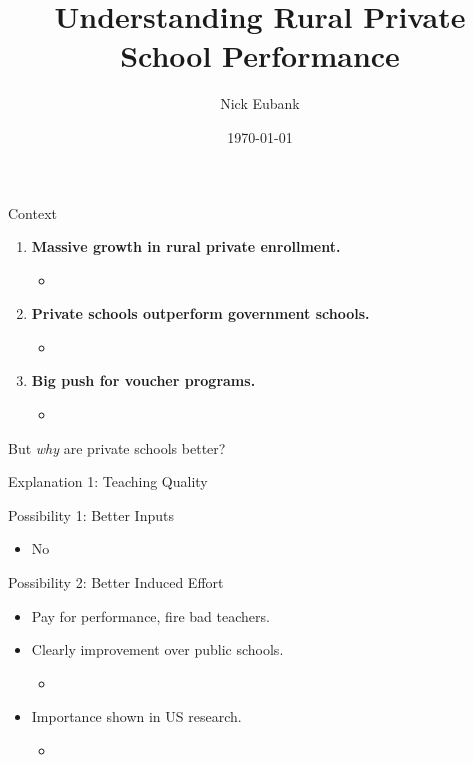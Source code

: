 \documentclass{beamer}
\title{Understanding Rural Private School Performance}
\author{Nick Eubank}
\date{\today}
\begin{document}
 

\begin{frame}{}
	\titlepage
\end{frame}

\begin{frame}{Context}
	\begin{enumerate}
		\item \textbf{Massive growth in rural private enrollment. }
			\begin{itemize}
				\item \cite{Andrabi:2008ji, Pratham:2005vw}
			\end{itemize}
		\pause
		\item \textbf{Private schools outperform government schools.}
			\begin{itemize}
				\item \cite{Jimenez:1991wa, Jimenez:1995vg, Pratham:2005vw, Andrabi:2011hl, Desai:2009ty, Tooley:2003vf, Alderman:2003we, Alderman:2001wk}
		\end{itemize}	
		\pause
		\item \textbf{Big push for voucher programs.}
		\begin{itemize}
			\item \cite{Chakrabarti:2008vc, Kelkar:2006tq, Panagariya:2008wi}
		\end{itemize}
	\end{enumerate}
\pause
But \emph{why} are private schools better?

\end{frame}


\begin{frame}{Explanation 1: Teaching Quality}

Possibility 1: Better Inputs
\begin{itemize}
	\pause
	\item No
\end{itemize} 
\pause	

Possibility 2: Better Induced Effort
	\begin{itemize}
		\item Pay for performance, fire bad teachers.
		\pause
		\item Clearly improvement over public schools. 
		\begin{itemize}
			\item \cite{Muralidharan:2008tb, Chaudhury:2006vp}
		\end{itemize}
		\pause
		\item Importance shown in US research.
		\begin{itemize}
			\item \cite{Hanushek:1997tt,Hanushek:2003hz,Banerjee:2007wx}
		\end{itemize}
	\end{itemize}
\end{frame}
\end{document}
